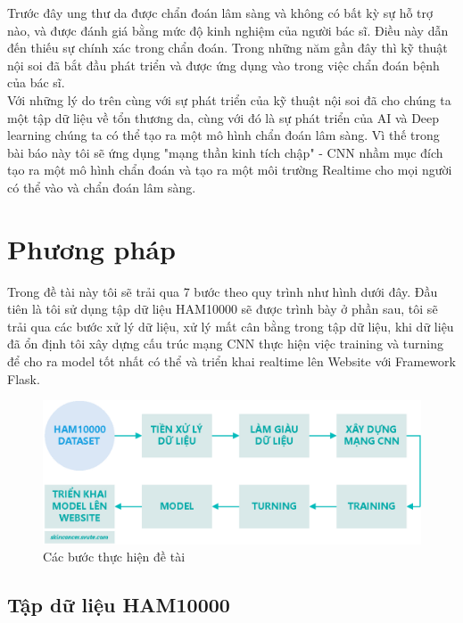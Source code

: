 \documentclass[12pt,a4paper]{article}
\begin{document}
	\noindent
	Trước đây ung thư da được chẩn đoán lâm sàng và không có bất kỳ sự hỗ trợ nào, và được đánh giá bằng mức độ kinh nghiệm của người bác sĩ. Điều này dẫn đến thiếu sự chính xác trong chẩn đoán. Trong những năm gần đây thì kỹ thuật nội soi đã bắt đầu phát triển và được ứng dụng vào  trong việc chẩn đoán bệnh của bác sĩ.\\
	
	\noindent
	Với những lý do trên cùng với sự phát triển của kỹ thuật nội soi đã cho chúng ta một tập dữ liệu về tổn thương da, cùng với đó là sự phát triển của AI và Deep learning chúng ta có thể tạo ra một mô hình chẩn đoán lâm sàng. Vì thế trong bài báo này tôi sẽ ứng dụng "mạng thần kinh tích chập" - CNN nhầm mục đích tạo ra một mô hình chẩn đoán và tạo ra một môi trường Realtime cho mọi người có thể vào và chẩn đoán lâm sàng.
	
	
	\section{Phương pháp}
	
	Trong đề tài này tôi sẽ trải qua 7 bước theo quy trình như hình dưới đây. Đầu tiên là tôi sử dụng tập dữ liệu HAM10000 sẽ được trình bày ở phần sau, tôi sẽ trải qua các bước xử lý dữ liệu, xử lý mất cân bằng trong tập dữ liệu, khi dữ liệu đã ổn định tôi xây dựng cấu trúc mạng CNN thực hiện việc training và turning để cho ra model tốt nhất có thể và triển khai realtime lên Website với Framework Flask.
	
	\begin{figure}[h!]
		\centering
		\includegraphics[width=0.8\linewidth]{./images/quatrinh.eps}
		\caption{Các bước thực hiện đề tài}
		\label{fig:quatrinh}
	\end{figure}
	
	\subsection{Tập dữ liệu HAM10000}
	
\end{document}
